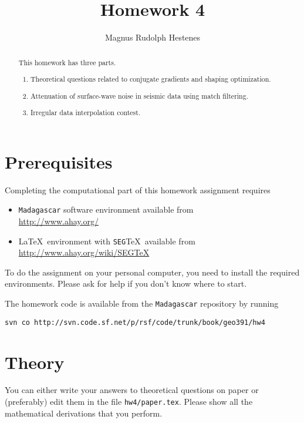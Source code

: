 \author{Magnus Rudolph Hestenes}
\title{Homework 4}

\begin{abstract}
  This homework has three parts. 
  \begin{enumerate}
  \item Theoretical questions related to conjugate gradients and shaping optimization.
  \item Attenuation of surface-wave noise in 
    seismic data using match filtering.
  \item Irregular data interpolation contest.
  \end{enumerate}
\end{abstract}

\section{Prerequisites}

Completing the computational part of this homework assignment requires
\begin{itemize}
\item \texttt{Madagascar} software environment available from \\
\url{http://www.ahay.org/}
\item \LaTeX\ environment with \texttt{SEG}\TeX\ available from \\ 
\url{http://www.ahay.org/wiki/SEGTeX}
\end{itemize}
To do the assignment on your personal computer, you need to install
the required environments. Please ask for help if you don't know where
to start.

The homework code is available from the \texttt{Madagascar} repository
by running
\begin{verbatim}
svn co http://svn.code.sf.net/p/rsf/code/trunk/book/geo391/hw4
\end{verbatim}

\section{Theory}

You can either write your answers to theoretical questions on paper or
(preferably) edit them in the file \texttt{hw4/paper.tex}. Please show all the
mathematical derivations that you perform.

